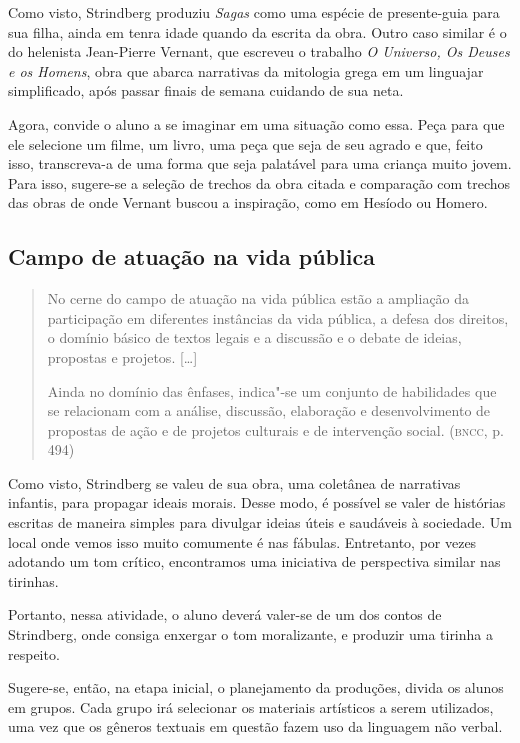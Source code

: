 \documentclass{extarticle}
\begin{document}
Como visto, Strindberg produziu \emph{Sagas} como uma espécie de
presente-guia para sua filha, ainda em tenra idade quando da escrita
da obra. Outro caso similar é o do helenista Jean-Pierre Vernant, que
escreveu o trabalho \emph{O Universo, Os Deuses e os Homens}, obra que
abarca narrativas da mitologia grega em um linguajar simplificado,
após passar finais de semana cuidando de sua neta.

Agora, convide o aluno a se imaginar em uma situação como essa. Peça
para que ele selecione um filme, um livro, uma peça que seja de seu
agrado e que, feito isso, transcreva-a de uma forma que seja palatável
para uma criança muito jovem. Para isso, sugere-se a seleção de trechos
da obra citada e comparação com trechos das obras de onde Vernant buscou
a inspiração, como em Hesíodo ou Homero.


\subsection{Campo de atuação na vida pública}

\begin{quote}
No cerne do campo de atuação na vida pública estão a ampliação da
participação em diferentes instâncias da vida pública, a defesa dos
direitos, o domínio básico de textos legais e a discussão e o debate de
ideias, propostas e projetos. {[}\ldots{}{]}

Ainda no domínio das ênfases, indica"-se um conjunto de habilidades que
se relacionam com a análise, discussão, elaboração e desenvolvimento de
propostas de ação e de projetos culturais e de intervenção social.
(\textsc{bncc}, p. 494)
\end{quote}


Como visto, Strindberg se valeu de sua obra, uma coletânea de
narrativas infantis, para propagar ideais morais. Desse modo, é
possível se valer de histórias escritas de maneira simples para
divulgar ideias úteis e saudáveis à sociedade. Um local onde vemos
isso muito comumente é nas fábulas. Entretanto, por vezes adotando um
tom crítico, encontramos uma iniciativa de perspectiva similar nas
tirinhas.


Portanto, nessa atividade, o aluno deverá valer-se de um dos contos de
Strindberg, onde consiga enxergar o tom moralizante, e produzir uma
tirinha a respeito.

Sugere-se, então, na etapa inicial, o planejamento da produções, divida
os alunos em grupos. Cada grupo irá selecionar os materiais artísticos a
serem utilizados, uma vez que os gêneros textuais em questão fazem uso
da linguagem não verbal.
\end{document}
